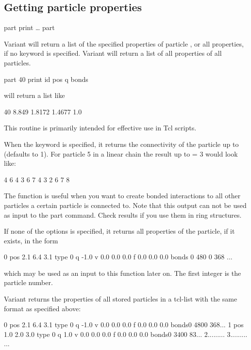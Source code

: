 \subsection{Getting particle properties}

\begin{essyntax}
  part  print
  \dots
   part
\end{essyntax}

Variant  will return a list of the specified properties of
particle , or all properties, if no keyword is
specified.  Variant  will return a list of all properties
of all particles.

\begin{code}
part 40 print id pos q bonds
\end{code}
will return a list like
\begin{tclcode}
40 8.849 1.8172 1.4677 1.0 {}
\end{tclcode}
This routine is primarily intended for effective use in Tcl scripts.

When the keyword  is specified, it returns the
connectivity of the particle up to  (defaults to 1). For
particle 5 in a linear chain the result up to  = 3 would
look like:
\begin{tclcode}
{ { 4 } { 6 } } { { 4 3 } { 6 7 } } { {4 3 2 } { 6 7 8 } } 
\end{tclcode}
The function is useful when you want to create bonded interactions to
all other particles a certain particle is connected to. Note that this
output can not be used as input to the part command. Check results if
you use them in ring structures.

If none of the options is specified, it returns all properties of the
particle, if it exists, in the form
\begin{tclcode}
  0 pos 2.1 6.4 3.1 type 0 q -1.0 v 0.0 0.0 0.0 f 0.0 0.0 0.0
  bonds { {0 480} {0 368} ... } 
\end{tclcode}
which may be used as an input to this function later on. The first
integer is the particle number.

Variant  returns the properties of all stored particles in
a tcl-list with the same format as specified above:
\begin{tclcode}
{0 pos 2.1 6.4 3.1 type 0 q -1.0 v 0.0 0.0 0.0 f 0.0 0.0 0.0
 bonds{{0 480}{0 368}...}} 
{1 pos 1.0 2.0 3.0 type 0 q 1.0 v 0.0 0.0 0.0 f 0.0 0.0 0.0
 bonds{{0 340}{0 83}...}} 
{2...{{...}...}}
{3...{{...}...}}
...
\end{tclcode}

